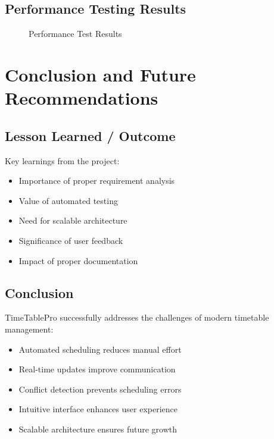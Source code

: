 \documentclass[12pt,a4paper]{report}
\begin{document}
\section{Performance Testing Results}
\begin{figure}[H]
\centering
{}
\caption{Performance Test Results}
\label{fig:performance}
\end{figure}

\chapter{Conclusion and Future Recommendations}
\section{Lesson Learned / Outcome}
Key learnings from the project:
\begin{itemize}
    \item Importance of proper requirement analysis
    \item Value of automated testing
    \item Need for scalable architecture
    \item Significance of user feedback
    \item Impact of proper documentation
\end{itemize}

\section{Conclusion}
TimeTablePro successfully addresses the challenges of modern timetable management:
\begin{itemize}
    \item Automated scheduling reduces manual effort
    \item Real-time updates improve communication
    \item Conflict detection prevents scheduling errors
    \item Intuitive interface enhances user experience
    \item Scalable architecture ensures future growth
\end{itemize}
\end{document}
